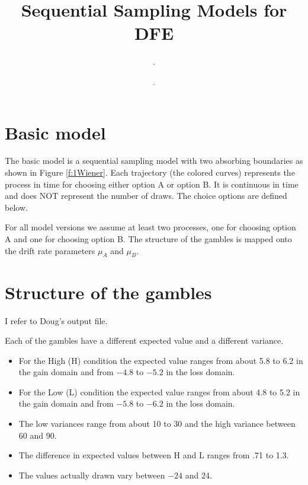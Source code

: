 \documentclass[english,doc]{apa}
\author{.} %
\affiliation{.} %
\begin{document}
\title{ Sequential Sampling Models for DFE}




\author{.} 
\maketitle
{}






\section{Basic model}
\noindent The basic model is a sequential sampling model with two absorbing boundaries as shown in Figure \ref{f:1Wiener}. Each trajectory (the colored curves) represents the process in time for choosing  either option A or option B. It is continuous in time and does NOT represent the number of draws. The choice options are defined below. 


\noindent For all model versions we assume at least two processes, one for choosing option A and one for choosing option B. The structure of the gambles is mapped onto the drift rate  parameters $\mu_A$ and $\mu_B$. 

\section{Structure of the gambles}
\noindent I refer to Doug's output file.

\noindent Each of the gambles have a different expected value and a different variance. 
\begin{itemize}
\item For the High (H) condition the expected value ranges from about 5.8 to 6.2 in the gain domain and from $-4.8$ to $-5.2$ in the loss domain.   

\item For the Low (L) condition the expected value ranges from about 4.8 to 5.2 in the gain domain and from $-5.8$ to $-6.2$ in the loss domain. 

\item The low variances range from about 10 to 30 and the high variance between 60 and 90.


\item The difference in expected values between H and L ranges from .71 to 1.3.

\item The values actually drawn vary between $-24$ and 24.
\end{itemize}
\end{document}
